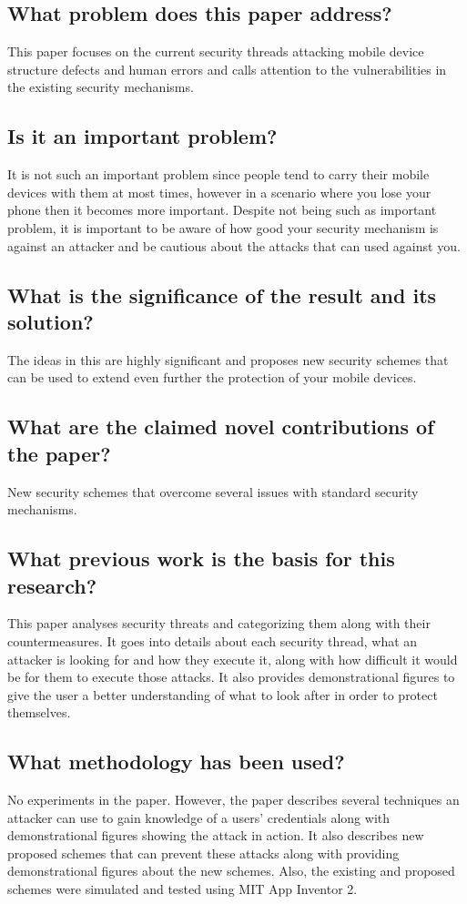 \documentclass[11pt,a4paper]{article}
\begin{document}
\subsection*{What problem does this paper address?}
This paper focuses on the current security threads attacking mobile device structure defects and human errors and calls attention to the vulnerabilities in the existing security mechanisms.  

\subsection*{Is it an important problem?}
It is not such an important problem since people tend to carry their mobile devices with them at most times, however in a scenario where you lose your phone then it becomes more important. Despite not being such as important problem, it is important to be aware of how good your security mechanism is against an attacker and be cautious about the attacks that can used against you. 

\subsection*{What is the significance of the result and its solution?}
The ideas in this are highly significant and proposes new security schemes that can be used to extend even further the protection of your mobile devices. 

\subsection*{What are the claimed novel contributions of the paper?}
New security schemes that overcome several issues with standard security mechanisms. 

\subsection*{What previous work is the basis for this research?}
This paper analyses security threats and categorizing them along with their countermeasures. It goes into details about each security thread, what an attacker is looking for and how they execute it, along with how difficult it would be for them to execute those attacks. It also provides demonstrational figures to give the user a better understanding of what to look after in order to protect themselves. 

\subsection*{What methodology has been used?}
No experiments in the paper. However, the paper describes several techniques an attacker can use to gain knowledge of a users’ credentials along with demonstrational figures showing the attack in action. It also describes new proposed schemes that can prevent these attacks along with providing demonstrational figures about the new schemes. Also, the existing and proposed schemes were simulated and tested using MIT App Inventor 2. 
\end{document}
